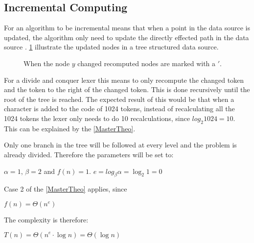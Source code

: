 \subsection{Incremental Computing}
For an algorithm to be incremental means that when a point in the data source
is updated, the algorithm only need to update the directly effected
path in the data source \cite{incrementalDef}. \cref{fig:incUp} illustrate
the updated nodes in a tree structured data source.

\begin{figure}[!htp]
\centering
\caption{When the node $y$ changed recomputed nodes are marked with a $'$. \label{fig:incUp}}
\end{figure}

For a divide and conquer lexer this means to only recompute the changed token
and the token to the right of the changed token. This is done recursively until
the root of the tree is reached. The expected result of this would be that when
a character is added to the code of 1024 tokens, instead of recalculating all
the 1024 tokens the lexer only needs to do 10 recalculations, since
$log_2 1024 = 10$. This can be explained by the \cref{MasterTheo}.

Only one branch in the tree will be followed at every level and the problem is
already divided. Therefore the parameters will be set to:
\begin{center}
$\alpha = 1$, $\beta = 2$ and $f(n) = 1$.
$e=log_\beta\alpha=\log_2 1=0$
\end{center}
Case 2 of the \cref{MasterTheo} applies, since
\begin{center}
$f(n) = \Theta(n^e)$
\end{center}
The complexity is therefore:
\begin{center}
$T(n) = \Theta(n^e \cdot \log n) = \Theta(\log n)$
\end{center}

